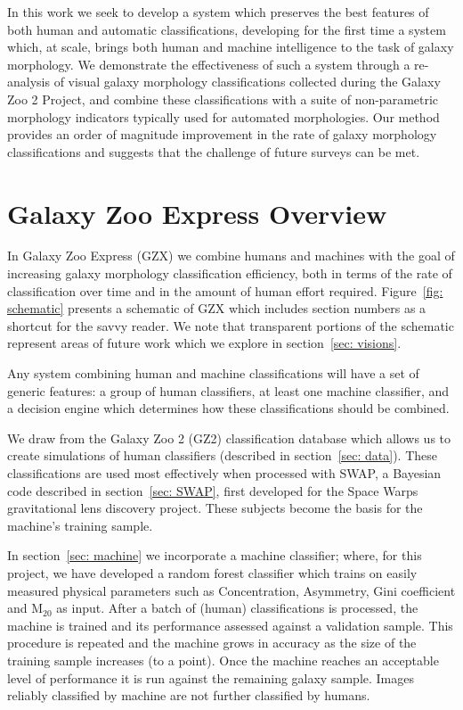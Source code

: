 \documentclass[twocolumn]{aastex6}
\begin{document}
In this work we seek to develop a system which preserves the best features of both human and automatic classifications,  developing for the first time a system which, at scale, brings both human and machine intelligence to the task of galaxy morphology. We demonstrate the effectiveness of such a system through a 
re-analysis of visual galaxy morphology classifications collected during the Galaxy Zoo 2
Project, and combine these classifications with a suite of non-parametric 
morphology indicators typically used for automated morphologies. Our method 
provides an order of magnitude improvement in the rate of galaxy morphology classifications and suggests that the challenge of future surveys can be met.





\section{Galaxy Zoo Express Overview}
In Galaxy Zoo Express (GZX) we combine humans and machines with the goal of 
increasing galaxy morphology classification efficiency, both in terms of the rate 
of classification over time and in the amount of human effort required. 
Figure~\ref{fig: schematic} presents a schematic of GZX which includes section 
numbers as a shortcut for the savvy reader. We note that transparent portions
 of the schematic represent areas of future work which we explore in section~\ref{sec: visions}. 

Any system combining human and machine classifications will have a set of generic 
features: a group of human classifiers, at least one machine classifier, and a 
decision engine which determines how these classifications should be combined.


We draw from the Galaxy Zoo 2 (GZ2) classification database which allows us to 
 create simulations of human classifiers (described in section~\ref{sec: data}).
These classifications are used most effectively when processed with SWAP, 
a Bayesian code described in  section~\ref{sec: SWAP}, first developed for the 
Space Warps gravitational lens discovery project. 
These subjects become the basis for the machine's training sample. 

In section~\ref{sec: machine} we incorporate a machine classifier; where, for this
project, we have developed a random forest classifier which trains on easily measured 
physical parameters such as Concentration, Asymmetry, Gini coefficient and M$_{20}$ as input. 
After a batch of (human) classifications is processed,  the machine is trained and 
its performance assessed against a validation sample. This procedure is repeated and 
the machine grows in accuracy as the size of the training sample increases (to a point). 
Once the machine reaches an acceptable level of performance it is run against the 
remaining galaxy sample. Images reliably classified by machine are not further classified by humans.
\end{document}
